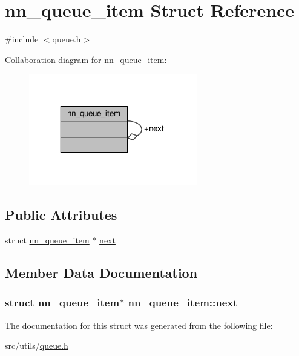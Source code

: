 \hypertarget{structnn__queue__item}{}\section{nn\+\_\+queue\+\_\+item Struct Reference}
\label{structnn__queue__item}


{\ttfamily \#include $<$queue.\+h$>$}



Collaboration diagram for nn\+\_\+queue\+\_\+item\+:\nopagebreak
\begin{figure}[H]
\begin{center}
\leavevmode
\includegraphics[width=208pt]{structnn__queue__item__coll__graph}
\end{center}
\end{figure}
\subsection*{Public Attributes}
\begin{DoxyCompactItemize}
\item 
struct \hyperlink{structnn__queue__item}{nn\+\_\+queue\+\_\+item} $\ast$ \hyperlink{structnn__queue__item_a075573448a6b40d50c2afd70dde9159b}{next}
\end{DoxyCompactItemize}


\subsection{Member Data Documentation}
\subsubsection[{next}]{\setlength{\rightskip}{0pt plus 5cm}struct {\bf nn\+\_\+queue\+\_\+item}$\ast$ nn\+\_\+queue\+\_\+item\+::next}\hypertarget{structnn__queue__item_a075573448a6b40d50c2afd70dde9159b}{}\label{structnn__queue__item_a075573448a6b40d50c2afd70dde9159b}


The documentation for this struct was generated from the following file\+:\begin{DoxyCompactItemize}
\item 
src/utils/\hyperlink{queue_8h}{queue.\+h}\end{DoxyCompactItemize}
